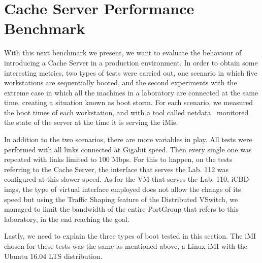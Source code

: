 


\section{Cache Server Performance Benchmark}
\label{sub:eval_cache_bench}

With this next benchmark we present, we want to evaluate the behaviour of introducing a Cache Server in a production environment. In order to obtain some interesting metrics, two types of tests were carried out, one scenario in which five workstations are sequentially booted, and the second experiments with the extreme case in which all the machines in a laboratory are connected at the same time, creating a situation known as boot storm. For each scenario, we measured the boot times of each workstation, and with a tool called netdata~\cite{netdata} monitored the state of the server at the time it is serving the iMis.

In addition to the two scenarios, there are more variables in play. All tests were performed with all links connected at Gigabit speed. Then every single one was repeated with links limited to 100 Mbps. For this to happen, on the tests referring to the Cache Server, the interface that serves the Lab. 112 was configured at this slower speed. As for the VM that serves the Lab. 110, iCBD-imgs, the type of virtual interface employed does not allow the change of its speed but using the Traffic Shaping feature of the Distributed VSwitch, we managed to limit the bandwidth of the entire PortGroup that refers to this laboratory, in the end reaching the goal.

Lastly, we need to explain the three types of boot tested in this section. The iMI chosen for these tests was the same as mentioned above, a Linux iMI with the Ubuntu 16.04 LTS distribution.

